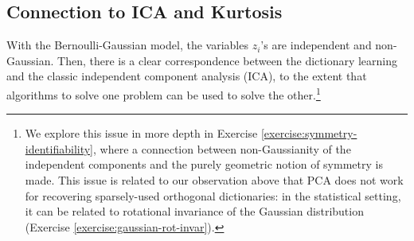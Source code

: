 \documentclass[\toplevelprefix/book-main.tex]{subfiles}
\begin{document}
%
%



\subsection{Connection to ICA and Kurtosis}
With the Bernoulli-Gaussian model, the variables $z_i$'s are independent and non-Gaussian. Then, there is a clear correspondence between the dictionary learning and the classic independent component analysis (ICA), to the extent that algorithms to solve one problem can be used to solve the other.\footnote{We explore this issue in more depth in Exercise \ref{exercise:symmetry-identifiability}, where a connection between non-Gaussianity of the independent components and the purely geometric notion of symmetry is made. This issue is related to our observation above that PCA does not work for recovering sparsely-used orthogonal dictionaries: in the statistical setting, it can be related to rotational invariance of the Gaussian distribution (Exercise \ref{exercise:gaussian-rot-invar}).} 
\end{document}
